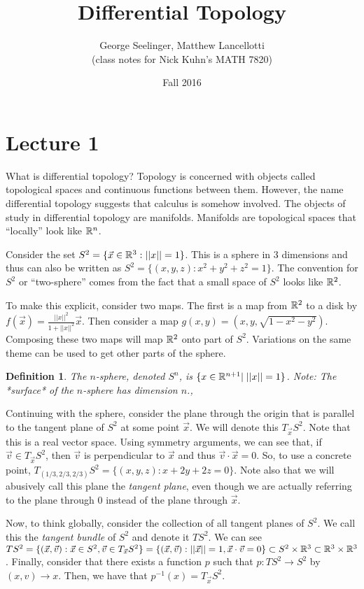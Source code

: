 \documentclass[11pt,leqno,oneside]{amsart}
\title[Differential Topology]{Differential Topology}
\author{George Seelinger, Matthew Lancellotti\\ (class notes for Nick Kuhn's MATH 7820)}
\date{Fall 2016}
\theoremstyle{mystyle} \newtheorem{thrm}[thm]{Theorem}
\theoremstyle{mystyle} \newtheorem{defi}[thm]{Definition}
\begin{document}
\maketitle
\section{Lecture 1}

What is differential topology? Topology is concerned with objects called
topological spaces and continuous functions between them. However, the name
differential topology suggests that calculus is somehow involved. The objects of
study in differential topology are manifolds. Manifolds are topological spaces
that ``locally'' look like ${\mathbb R}^n$.

\begin{example}
	Consider the set $S^2 = \{ \vec{x} \in {\mathbb R}^3: ||x||=1\}$. This is a sphere
	in 3 dimensions and thus can also be written as $S^2 = \{(x,y,z) :
	x^2+y^2+z^2=1\}$. The convention for $S^2$ or ``two-sphere'' comes from the
	fact that a small space of $S^2$ looks like ${\mathbb R}^2$.

	To make this explicit, consider two maps. The first is a map from ${\mathbb R}^2$ to
	a disk by $f(\vec{x}) = \frac{||x||^2}{1+||x||^2} \vec{x}$. Then consider a
	map $g(x,y) = (x,y,\sqrt{1-x^2-y^2})$. Composing these two maps will map
	${\mathbb R}^2$ onto part of $S^2$. Variations on the same theme can be used to get
	other parts of the sphere.
\end{example}
\begin{defi}
	The \emph{$n$-sphere}, denoted $S^n$, is $\{x \in {\mathbb R}^{n+1} |\; ||x||=1 \}$. Note: The *surface* of the $n$-sphere has dimension $n$.,
\end{defi}
\begin{example}
	Continuing with the sphere, consider the plane through the origin that is parallel to the tangent plane of $S^2$ at some
	point $\vec{x}$. We will denote this $T_{\vec{x}}S^2$. Note that this is a
	real vector space. Using symmetry arguments, we can see that, if $\vec{v}
	\in T_{\vec{x}}S^2$, then $\vec{v}$ is perpendicular to $\vec{x}$ and thus
	$\vec{v} \cdot \vec{x} = 0$. So, to use a concrete point,
	$T_{(1/3,2/3,2/3)} S^2 = \{(x,y,z) : x+2y+2z=0\}$.  Note also that we will abusively call this plane the \emph{tangent plane}, even though we are actually referring to the plane through $0$ instead of the plane through $\vec{x}$.
\end{example}
\begin{example}
	Now, to think globally, consider the collection of all tangent planes of
	$S^2$. We call this the \emph{tangent bundle} of $S^2$ and denote it
	$TS^2$. We can see $TS^2 = \{(\vec{x}, \vec{v}): \vec{x} \in S^2, \vec{v}
	\in T_{\vec{x}} S^2\} = \{(\vec{x},\vec{v}) : ||\vec{x}|| = 1, \vec{x}
	\cdot \vec{v} = 0\} \subset S^2 \times {\mathbb R}^3 \subset {\mathbb R}^3 \times {\mathbb R}^3$.
	Finally, consider that there exists a function $p$ such that $p: TS^2 \to
	S^2$ by $(x,v) \to x$. Then, we have that $p^{-1}(x) = T_{\vec{x}}S^2$.
\end{example}
\end{document}
